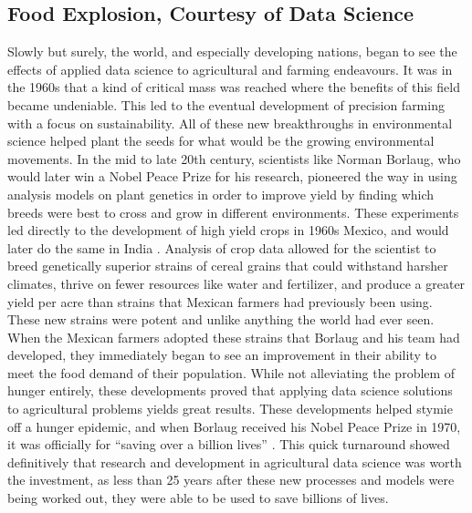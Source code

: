 \documentclass[sigconf]{acmart}
\begin{document}
\subsection{Food Explosion, Courtesy of Data Science}

Slowly but surely, the world, and especially developing nations, began to see the effects of applied data science to agricultural and farming endeavours. It was in the 1960s that a kind of critical mass was reached where the benefits of this field became undeniable. This led to the eventual development of precision farming with a focus on sustainability. All of these new breakthroughs in environmental science helped plant the seeds for what would be the growing environmental movements. In the mid to late 20th century, scientists like Norman Borlaug, who would later win a Nobel Peace Prize for his research, pioneered the way in using analysis models on plant genetics in order to improve yield by finding which breeds were best to cross and grow in different environments. These experiments led directly to the development of high yield crops in 1960s Mexico, and would later do the same in India \cite{borlaug2007}. Analysis of crop data allowed for the scientist to breed genetically superior strains of cereal grains that could withstand harsher climates, thrive on fewer resources like water and fertilizer, and produce a greater yield per acre than strains that Mexican farmers had previously been using. These new strains were potent and unlike anything the world had ever seen. When the Mexican farmers adopted these strains that Borlaug and his team had developed, they immediately began to see an improvement in their ability to meet the food demand of their population. While not alleviating the problem of hunger entirely, these developments proved that applying data science solutions to agricultural problems yields great results. These developments helped stymie off a hunger epidemic, and when Borlaug received his Nobel Peace Prize in 1970, it was officially for ``saving over a billion lives'' \cite{borlaug2002}. This quick turnaround showed definitively that research and development in agricultural data science was worth the investment, as less than 25 years after these new processes and models were being worked out, they were able to be used to save billions of lives.
\end{document}
